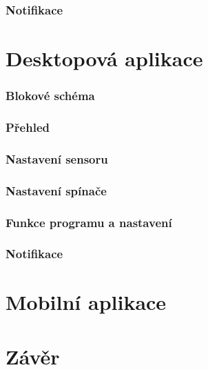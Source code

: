 \documentclass[FM,MP]{tulthesis}  %
\begin{document}
\subsection{Notifikace}


\chapter{Desktopová aplikace}

\subsection{Blokové schéma}

\subsection{Přehled}

\subsection{Nastavení sensoru}

\subsection{Nastavení spínače}

\subsection{Funkce programu a nastavení}

\subsection{Notifikace}


\chapter{Mobilní aplikace}


\chapter{Závěr}

\end{document}
